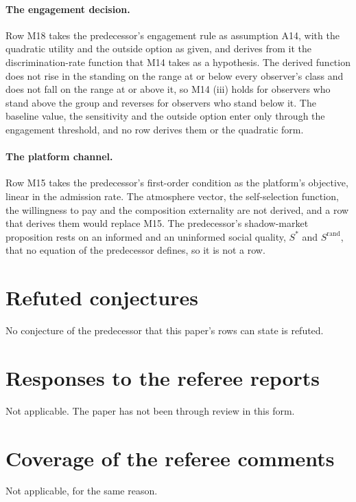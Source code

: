 \paragraph{The engagement decision.} Row M18 takes the predecessor's
engagement rule as assumption A14, with the quadratic utility and the
outside option as given, and derives from it the discrimination-rate
function that M14 takes as a hypothesis. The derived function does not rise
in the standing on the range at or below every observer's class and does not
fall on the range at or above it, so M14 (iii) holds for observers who stand
above the group and reverses for observers who stand below it. The baseline
value, the sensitivity and the outside option enter only through the
engagement threshold, and no row derives them or the quadratic form.

\paragraph{The platform channel.} Row M15 takes the predecessor's
first-order condition as the platform's objective, linear in the admission
rate. The atmosphere vector, the
self-selection function, the willingness to pay and the composition
externality are not derived, and a row that derives them would replace M15.
The predecessor's shadow-market proposition rests on an informed and an
uninformed social quality, $S^\ast$ and $S^{\mathrm{rand}}$, that no equation
of the predecessor defines, so it is not a row.

\section{Refuted conjectures}
\label{app:refuted}

No conjecture of the predecessor that this paper's rows can state is
refuted.

\section{Responses to the referee reports}

Not applicable. The paper has not been through review in this form.

\section{Coverage of the referee comments}

Not applicable, for the same reason.


